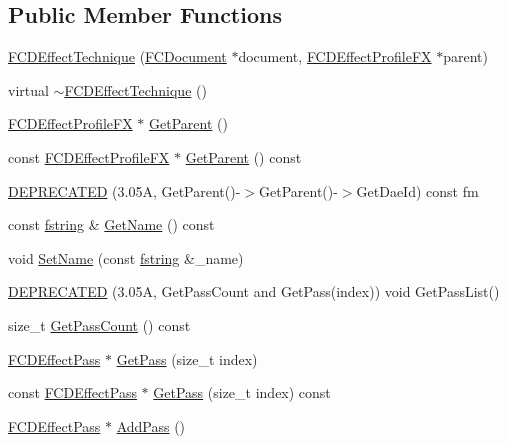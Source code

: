 \subsection*{Public Member Functions}
\begin{DoxyCompactItemize}
\item 
\hyperlink{classFCDEffectTechnique_a1e47ee8356ddfaf650da3601733d2394}{FCDEffectTechnique} (\hyperlink{classFCDocument}{FCDocument} $\ast$document, \hyperlink{classFCDEffectProfileFX}{FCDEffectProfileFX} $\ast$parent)
\item 
virtual \hyperlink{classFCDEffectTechnique_a63421c500dc1aea4d475f5cf77300d71}{$\sim$FCDEffectTechnique} ()
\item 
\hyperlink{classFCDEffectProfileFX}{FCDEffectProfileFX} $\ast$ \hyperlink{classFCDEffectTechnique_ac4649a643cf6949375115dd31a775b28}{GetParent} ()
\item 
const \hyperlink{classFCDEffectProfileFX}{FCDEffectProfileFX} $\ast$ \hyperlink{classFCDEffectTechnique_af1d184dd73bc107f25d6b12debaf5625}{GetParent} () const 
\item 
\hyperlink{classFCDEffectTechnique_a67b10f9e49ba3cb4ae2bb498d8197f36}{DEPRECATED} (3.05A, GetParent()-\/$>$GetParent()-\/$>$GetDaeId) const fm
\item 
const \hyperlink{classfm_1_1stringT}{fstring} \& \hyperlink{classFCDEffectTechnique_a2d3245870ddab9ce3b442e5afd708a52}{GetName} () const 
\item 
void \hyperlink{classFCDEffectTechnique_a07bca55857e485109ce1b499ceef6a40}{SetName} (const \hyperlink{classfm_1_1stringT}{fstring} \&\_\-name)
\item 
\hyperlink{classFCDEffectTechnique_ac454b0b966bd0ee9dfd181cae1e3cb7b}{DEPRECATED} (3.05A, GetPassCount and GetPass(index)) void GetPassList()
\item 
size\_\-t \hyperlink{classFCDEffectTechnique_a71dae8aafce949a83b7bf0361bc68910}{GetPassCount} () const 
\item 
\hyperlink{classFCDEffectPass}{FCDEffectPass} $\ast$ \hyperlink{classFCDEffectTechnique_a2b957bde5e7142e14724bea627226eff}{GetPass} (size\_\-t index)
\item 
const \hyperlink{classFCDEffectPass}{FCDEffectPass} $\ast$ \hyperlink{classFCDEffectTechnique_a02721f15869f261d94438d8a1837ed75}{GetPass} (size\_\-t index) const 
\item 
\hyperlink{classFCDEffectPass}{FCDEffectPass} $\ast$ \hyperlink{classFCDEffectTechnique_a485529a79e25dfb6c9d9f3b6ebc4d5c4}{AddPass} ()
\item 

\end{DoxyCompactItemize}
